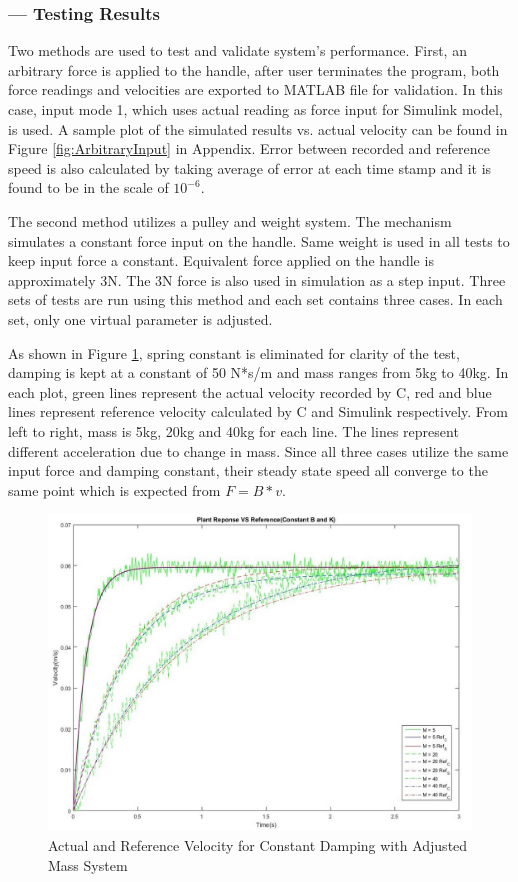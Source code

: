 \subsubsection*{ --- Testing Results}
Two methods are used to test and validate system's performance. First, an arbitrary force is applied to the handle, after user terminates the program, both force readings and velocities are exported to MATLAB file for validation. In this case, input mode 1, which uses actual reading as force input for Simulink model, is used. A sample plot of the simulated results vs. actual velocity can be found in Figure \ref{fig:ArbitraryInput} in Appendix. Error between recorded and reference speed is also calculated by taking average of error at each time stamp and it is found to be in the scale of $10^{-6}$. 

The second method utilizes a pulley and weight system. The mechanism simulates a constant force input on the handle. Same weight is used in all tests to keep input force a constant. Equivalent force applied on the handle is approximately 3N. The 3N force is also used in simulation as a step input. Three sets of tests are run using this method and each set contains three cases. In each set, only one virtual parameter is adjusted. 

As shown in Figure \ref{fig:MChange}, spring constant is eliminated for clarity of the test, damping is kept at a constant of 50 N*s/m and mass ranges from 5kg to 40kg. In each plot, green lines represent the actual velocity recorded by C, red and blue lines represent reference velocity calculated by C and Simulink respectively. From left to right, mass is 5kg, 20kg and 40kg for each line. The lines represent different acceleration due to change in mass.  Since all three cases utilize the same input force and damping constant, their steady state speed all converge to the same point which is expected from $F=B*v$.
\begin{figure}[H]
\centering
\includegraphics[width=1\linewidth]{Images/MChange}
\caption{Actual and Reference Velocity for Constant Damping with Adjusted Mass System}
\label{fig:MChange}
\end{figure}

